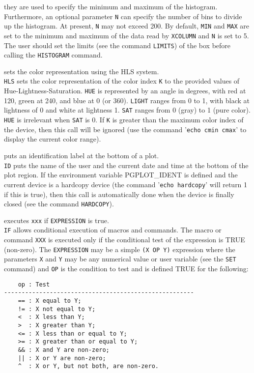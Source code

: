 	they are used to specify the minimum and maximum of the histogram.
	Furthermore, an optional parameter {\tt N} can specify the
	number of bins to divide up the histogram.  At present, {\tt N}
	may not exceed 200.  By default, {\tt MIN} and {\tt MAX}
	are set to the minimum and maximum of the data read by
	{\tt XCOLUMN} and {\tt N} is set
	to 5.  The user should set the limits (see the command
	{\tt LIMITS}) of the box before calling
	the {\tt HISTOGRAM} command.
\item [{\tt HLS K hue light sat } --] sets the color representation using the HLS system.\\
	{\tt HLS} sets the color representation of the color index
	{\tt K} to the provided values of Hue-Lightness-Saturation.
	{\tt HUE} is represented by an angle in degrees, with red
	at 120, green at 240, and blue at 0 (or 360).  {\tt LIGHT}
	ranges from 0 to 1, with black at lightness of 0 and white at
	lightness 1.  {\tt SAT} ranges from 0 (gray) to 1 (pure color).
	{\tt HUE} is irrelevant when {\tt SAT} is 0.  If
	{\tt K} is greater than the maximum color index of the device,
	then this call will be ignored (use the command
	'{\tt echo cmin cmax}'
	to display the current color range).
\item [{\tt ID } --] puts an identification label at the bottom of a plot.\\
	{\tt ID} puts the name of the user and the current date
	and time at the bottom of the plot region.  If the environment
	variable PGPLOT\_IDENT is defined and the current device is a hardcopy
	device (the command '{\tt echo hardcopy}'
	will return 1 if this is true), then this call is automatically
	done when the device is finally closed (see the command
	{\tt HARDCOPY}).
\item [{\tt IF EXPRESSION XXX [\dots] } --] executes {\tt xxx} if {\tt EXPRESSION} is true.\\
	{\tt IF} allows conditional execution of macros and commands.
	The macro or command {\tt XXX} is executed only if the
	conditional test of the expression is TRUE (non-zero).  The
	{\tt EXPRESSION} may be a simple {\tt (X OP Y)}
	expression where the parameters {\tt X} and {\tt Y}
	may be any numerical value or user variable (see the
	{\tt SET} command) and {\tt OP} is
	the condition to test and is defined TRUE for the following:
	\begin{verbatim}
    op : Test
------------------------------------------------------
    == : X equal to Y;
    != : X not equal to Y;
    <  : X less than Y;
    >  : X greater than Y;
    <= : X less than or equal to Y;
    >= : X greater than or equal to Y;
    && : X and Y are non-zero;
    || : X or Y are non-zero;
    ^  : X or Y, but not both, are non-zero.
	\end{verbatim}
